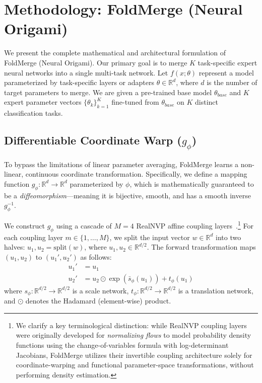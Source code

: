 \section{Methodology: FoldMerge (Neural Origami)}
\label{sec:method}

We present the complete mathematical and architectural formulation of FoldMerge (Neural Origami). 
Our primary goal is to merge $K$ task-specific expert neural networks into a single multi-task network. 
Let $f(x; \theta)$ represent a model parameterized by task-specific layers or adapters $\theta \in \mathbb{R}^d$, where $d$ is the number of target parameters to merge. 
We are given a pre-trained base model $\theta_{base}$ and $K$ expert parameter vectors $\{ \theta_k \}_{k=1}^K$ fine-tuned from $\theta_{base}$ on $K$ distinct classification tasks.

\subsection{Differentiable Coordinate Warp ($g_\phi$)}
To bypass the limitations of linear parameter averaging, FoldMerge learns a non-linear, continuous coordinate transformation. 
Specifically, we define a mapping function $g_\phi: \mathbb{R}^d \to \mathbb{R}^d$ parameterized by $\phi$, which is mathematically guaranteed to be a \emph{diffeomorphism}—meaning it is bijective, smooth, and has a smooth inverse $g_\phi^{-1}$.

We construct $g_\phi$ using a cascade of $M = 4$ RealNVP affine coupling layers~\cite{dinh2016density}.\footnote{We clarify a key terminological distinction: while RealNVP coupling layers were originally developed for \emph{normalizing flows} to model probability density functions using the change-of-variables formula with log-determinant Jacobians, FoldMerge utilizes their invertible coupling architecture solely for coordinate-warping and functional parameter-space transformations, without performing density estimation.} 
For each coupling layer $m \in \{1, \dots, M\}$, we split the input vector $w \in \mathbb{R}^d$ into two halves: $u_1, u_2 = \text{split}(w)$, where $u_1, u_2 \in \mathbb{R}^{d/2}$. 
The forward transformation maps $(u_1, u_2)$ to $(u_1', u_2')$ as follows:
\begin{align}
  u_1' &= u_1 \\
  u_2' &= u_2 \odot \exp(\bar{s}_\phi(u_1)) + t_\phi(u_1)
\end{align}
where $s_\phi: \mathbb{R}^{d/2} \to \mathbb{R}^{d/2}$ is a scale network, $t_\phi: \mathbb{R}^{d/2} \to \mathbb{R}^{d/2}$ is a translation network, and $\odot$ denotes the Hadamard (element-wise) product. 

